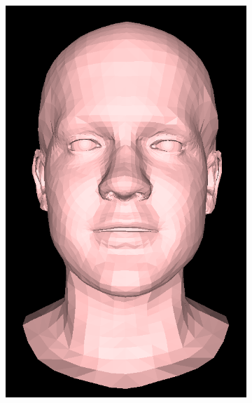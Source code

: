 \begin{figure}[h!]
\begin{subfigure}[b]{0.19\textwidth}
        \includegraphics[width=\textwidth]{figures/gen_sample/00021.png}
    \end{subfigure}
    \begin{subfigure}[b]{0.19\textwidth}

\end{subfigure}
\end{figure}
